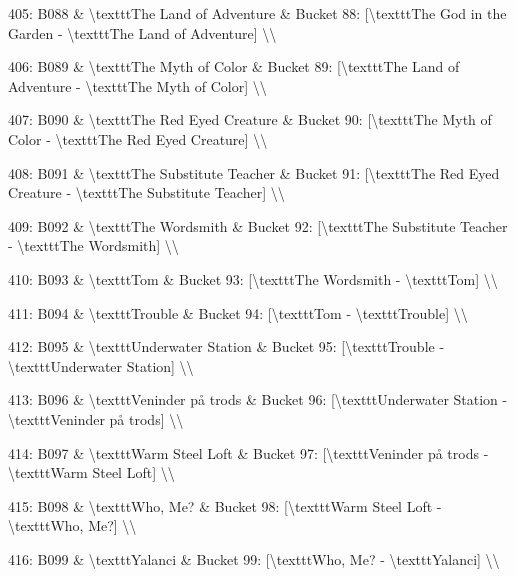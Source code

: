 \documentclass[11pt,a4paper]{article}
\begin{document}
405: B088 \& \textbackslash{}texttt{The Land of Adventure} \& Bucket 88: [\textbackslash{}texttt{The God in the Garden} - \textbackslash{}texttt{The Land of Adventure}] \textbackslash{}\textbackslash{}

406: B089 \& \textbackslash{}texttt{The Myth of Color} \& Bucket 89: [\textbackslash{}texttt{The Land of Adventure} - \textbackslash{}texttt{The Myth of Color}] \textbackslash{}\textbackslash{}

407: B090 \& \textbackslash{}texttt{The Red Eyed Creature} \& Bucket 90: [\textbackslash{}texttt{The Myth of Color} - \textbackslash{}texttt{The Red Eyed Creature}] \textbackslash{}\textbackslash{}

408: B091 \& \textbackslash{}texttt{The Substitute Teacher} \& Bucket 91: [\textbackslash{}texttt{The Red Eyed Creature} - \textbackslash{}texttt{The Substitute Teacher}] \textbackslash{}\textbackslash{}

409: B092 \& \textbackslash{}texttt{The Wordsmith} \& Bucket 92: [\textbackslash{}texttt{The Substitute Teacher} - \textbackslash{}texttt{The Wordsmith}] \textbackslash{}\textbackslash{}

410: B093 \& \textbackslash{}texttt{Tom} \& Bucket 93: [\textbackslash{}texttt{The Wordsmith} - \textbackslash{}texttt{Tom}] \textbackslash{}\textbackslash{}

411: B094 \& \textbackslash{}texttt{Trouble} \& Bucket 94: [\textbackslash{}texttt{Tom} - \textbackslash{}texttt{Trouble}] \textbackslash{}\textbackslash{}

412: B095 \& \textbackslash{}texttt{Underwater Station} \& Bucket 95: [\textbackslash{}texttt{Trouble} - \textbackslash{}texttt{Underwater Station}] \textbackslash{}\textbackslash{}

413: B096 \& \textbackslash{}texttt{Veninder på trods} \& Bucket 96: [\textbackslash{}texttt{Underwater Station} - \textbackslash{}texttt{Veninder på trods}] \textbackslash{}\textbackslash{}

414: B097 \& \textbackslash{}texttt{Warm Steel Loft} \& Bucket 97: [\textbackslash{}texttt{Veninder på trods} - \textbackslash{}texttt{Warm Steel Loft}] \textbackslash{}\textbackslash{}

415: B098 \& \textbackslash{}texttt{Who, Me?} \& Bucket 98: [\textbackslash{}texttt{Warm Steel Loft} - \textbackslash{}texttt{Who, Me?}] \textbackslash{}\textbackslash{}

416: B099 \& \textbackslash{}texttt{Yalanci} \& Bucket 99: [\textbackslash{}texttt{Who, Me?} - \textbackslash{}texttt{Yalanci}] \textbackslash{}\textbackslash{}
\end{document}
